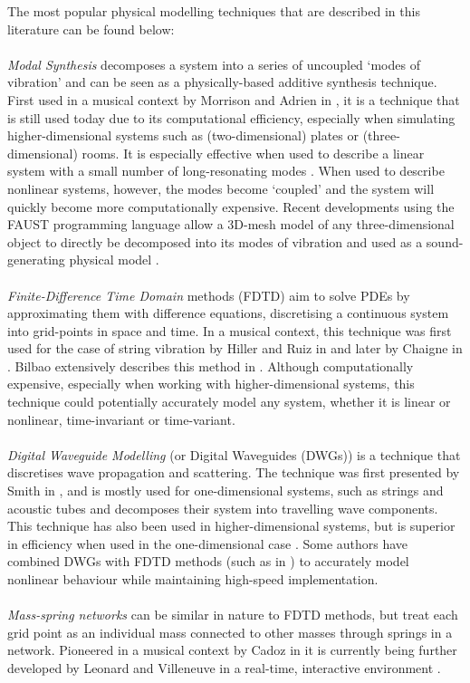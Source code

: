 The most popular physical modelling techniques that are described in this literature can be found below:
\\
\\
\textit{Modal Synthesis} decomposes a system into a series of uncoupled `modes of vibration' and can be seen as a physically-based additive synthesis technique. First used in a musical context by Morrison and Adrien in \cite{Morrison1993}, it is a technique that is still used today due to its computational efficiency, especially when simulating higher-dimensional systems such as (two-dimensional) plates or (three-dimensional) rooms. It is especially effective when used to describe a linear system with a small number of long-resonating modes \cite{Bilbao2018, Smith2010a}. When used to describe nonlinear systems, however, the modes become `coupled’ and the system will quickly become more computationally expensive. Recent developments using the FAUST programming language allow a 3D-mesh model of any three-dimensional object to directly be decomposed into its modes of vibration and used as a sound-generating physical model \cite{MichonMesh2Faust2017}.
\\
\\
\textit{Finite-Difference Time Domain} methods (FDTD) aim to solve PDEs by approximating them with difference equations, discretising a continuous system into grid-points in space and time. In a musical context, this technique was first used for the case of string vibration by Hiller and Ruiz in \cite{Ruiz1969, Hiller1971I, Hiller1971II} and later by Chaigne in \cite{Chaigne1992, Chaigne1994}. Bilbao extensively describes this method in \cite{theBible, Bilbao2018}. Although computationally expensive, especially when working with higher-dimensional systems, this technique could potentially accurately model any system, whether it is linear or nonlinear, time-invariant or time-variant.
\\
\\
\textit{Digital Waveguide Modelling} (or Digital Waveguides (DWGs)) is a technique that discretises wave propagation and scattering. The technique was first presented by Smith in \cite{Smith1987, Smith1992}, and is mostly used for one-dimensional systems, such as strings and acoustic tubes and decomposes their system into travelling wave components. This technique has also been used in higher-dimensional systems, but is superior in efficiency when used in the one-dimensional case \cite{Valimaki2006}. Some authors have combined DWGs with FDTD methods (such as in \cite{Erkut2002, Maestre2014}) to accurately model nonlinear behaviour while maintaining high-speed implementation.
\\
\\
\textit{Mass-spring networks} can be similar in nature to FDTD methods, but treat each grid point as an individual mass connected to other masses through springs in a network. Pioneered in a musical context by Cadoz in \cite{Cadoz1979, Cadoz1983, Cadoz1993} it is currently being further developed by Leonard and Villeneuve in a real-time, interactive environment \cite{Villeneuve2019, Leonard2019}.

